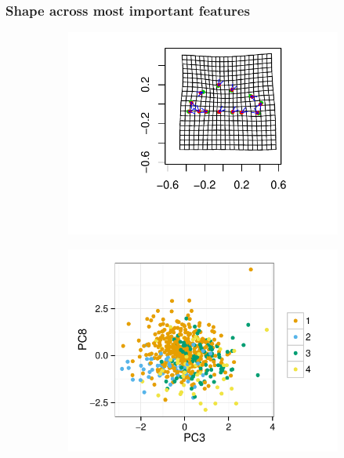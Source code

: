 \documentclass{beamer}\usepackage{graphicx, color}
\begin{document}
\begin{frame}
  \frametitle{Shape across most important features}




\begin{figure}[h]
  \centering
  \hspace*{\fill}
  \begin{subfigure}[h]{0.3\textwidth}
    \centering
    \includegraphics[width = \textwidth]{figure/tps2}    
  \end{subfigure}
  \begin{subfigure}[h]{0.3\textwidth}
    \centering
    \includegraphics[width = \textwidth]{figure/tps5}    

\end{subfigure}
\end{figure}
\end{frame}
\end{document}
